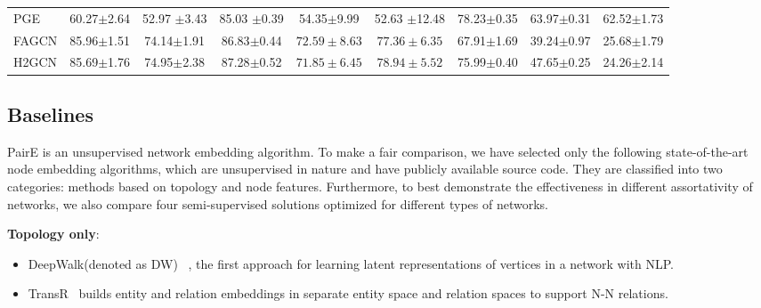 \documentclass[10pt,journal,compsoc]{IEEEtran}
\begin{document}
\begin{table*}[!htb]
\begin{center}
\begin{tabular}{p{4.5em}|c|c|c|c|c|c|c|c}
    PGE&60.27$\pm$2.64 & 52.97 $\pm$3.43 & 85.03 $\pm$0.39 & 54.35$\pm$9.99 & 52.63 $\pm$12.48 &78.23$\pm$0.35 & 63.97$\pm$0.31 & 62.52$\pm$1.73 \\
    FAGCN& 85.96$\pm$1.51	&74.14$\pm$1.91	& 86.83$\pm$0.44 & $72.59\pm8.63$& $77.36\pm6.35$ & 67.91$\pm$1.69	&39.24$\pm$0.97	&25.68$\pm$1.79\\
    H2GCN& 85.69$\pm$1.76 & 74.95$\pm$2.38 & 87.28$\pm$0.52 & $71.85\pm6.45$ & \colorbox{mygray}{$78.94\pm5.52$} & 75.99$\pm$0.40 &47.65$\pm$0.25 &24.26$\pm$2.14\\
    \hline
    \end{tabular}
    \end{center}
\end{table*}
  
\subsection{Baselines}

PairE is an unsupervised network embedding algorithm. To make a fair comparison,  we have selected only the following state-of-the-art node embedding algorithms, which are unsupervised in nature and have publicly available source code. They are classified into two categories: methods based on topology and node features. Furthermore, to best demonstrate the effectiveness in different assortativity of networks, we also compare four semi-supervised solutions optimized for different types of networks. 


\noindent  \textbf{Topology only}:
\begin{itemize}
\item  DeepWalk(denoted as DW) ~\cite{Perozzi14}, the first approach for learning latent representations of vertices in a network with NLP. 
\item  {TransR}~\cite{TransR15} builds entity and relation embeddings in separate entity space and relation spaces to support N-N relations. 
\end{itemize}
\end{document}

